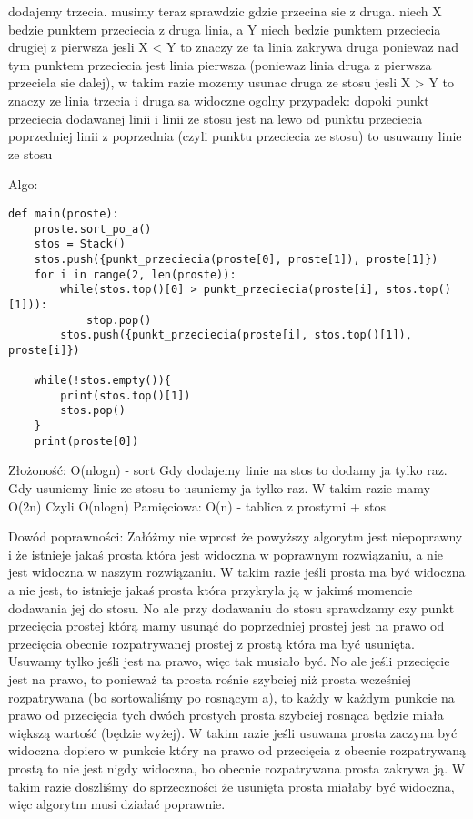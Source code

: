 \documentclass[12pt]{article}
\begin{document}
dodajemy trzecia. musimy teraz sprawdzic gdzie przecina sie z druga.
niech X bedzie punktem przeciecia z druga linia, a Y niech bedzie punktem przeciecia drugiej z pierwsza 
jesli X < Y to znaczy ze ta linia zakrywa druga poniewaz nad tym punktem przeciecia jest linia pierwsza (poniewaz linia druga z pierwsza przeciela sie dalej), w takim razie mozemy usunac druga ze stosu 
jesli X > Y to znaczy ze linia trzecia i druga sa widoczne 
ogolny przypadek:
dopoki punkt przeciecia dodawanej linii i linii ze stosu jest na lewo od punktu przeciecia poprzedniej linii z poprzednia (czyli punktu przeciecia ze stosu) to usuwamy linie ze stosu 

Algo:

\begin{lstlisting}
def main(proste):
	proste.sort_po_a()
	stos = Stack()
	stos.push({punkt_przeciecia(proste[0], proste[1]), proste[1]})
	for i in range(2, len(proste)):
		while(stos.top()[0] > punkt_przeciecia(proste[i], stos.top()[1])):
			stop.pop()
		stos.push({punkt_przeciecia(proste[i], stos.top()[1]), proste[i]})
	
	while(!stos.empty()){
		print(stos.top()[1])
		stos.pop()
	}
	print(proste[0])
\end{lstlisting}

Złożoność:
O(nlogn) - sort 
Gdy dodajemy linie na stos to dodamy ja tylko raz. Gdy usuniemy linie ze stosu to usuniemy ja tylko raz. W takim razie mamy O(2n) 
Czyli O(nlogn)
Pamięciowa:
O(n) - tablica z prostymi + stos 

Dowód poprawności:
Załóżmy nie wprost że powyższy algorytm jest niepoprawny i że istnieje jakaś prosta która jest widoczna w poprawnym rozwiązaniu, a nie jest widoczna w naszym rozwiązaniu. W takim razie jeśli prosta ma być widoczna a nie jest, to istnieje jakaś prosta która przykryła ją w jakimś momencie dodawania jej do stosu. No ale przy dodawaniu do stosu sprawdzamy czy punkt przecięcia prostej którą mamy usunąć do poprzedniej prostej jest na prawo od przecięcia obecnie rozpatrywanej prostej z prostą która ma być usunięta. Usuwamy tylko jeśli jest na prawo, więc tak musiało być. No ale jeśli przecięcie jest na prawo, to ponieważ ta prosta rośnie szybciej niż prosta wcześniej rozpatrywana (bo sortowaliśmy po rosnącym a), to każdy w każdym punkcie na prawo od przecięcia tych dwóch prostych prosta szybciej rosnąca będzie miała większą wartość (będzie wyżej). W takim razie jeśli usuwana prosta zaczyna być widoczna dopiero w punkcie który na prawo od przecięcia z obecnie rozpatrywaną prostą to nie jest nigdy widoczna, bo obecnie rozpatrywana prosta zakrywa ją. W takim razie doszliśmy do sprzeczności że usunięta prosta miałaby być widoczna, więc algorytm musi działać poprawnie. 
\end{document}
